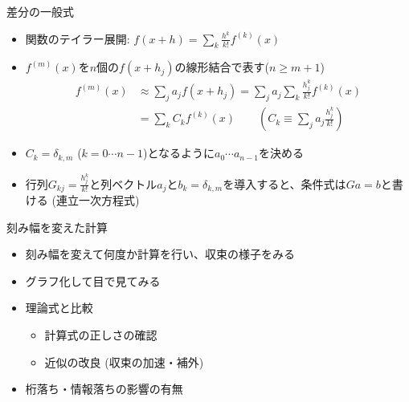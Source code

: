 \begin{frame}[t,fragile]{差分の一般式}
  \begin{itemize}
  \item 関数のテイラー展開: $\displaystyle f(x+h) = \sum_{k} \frac{h^k}{k!} f^{(k)}(x)$
  \item $f^{(m)}(x)$を$n$個の$f(x+h_j)$の線形結合で表す($n \ge m+1$)
    \begin{align*}
      f^{(m)}(x) &\approx \sum_j a_j f(x+h_j) = \sum_j a_j \sum_{k} \frac{h_j^k}{k!} f^{(k)}(x) \\
      & = \sum_{k} C_k f^{(k)}(x) \qquad (C_k \equiv \sum_j a_j \frac{h_j^k}{k!})
    \end{align*}
  \item $C_k = \delta_{k,m}$ ($k = 0 \cdots n-1$)となるように$a_0 \cdots a_{n-1}$を決める
  \item 行列$\displaystyle G_{kj} = \frac{h_j^k}{k!}$と列ベクトル$a_j$と$b_k = \delta_{k,m}$を導入すると、条件式は$G a = b$と書ける (連立一次方程式)
  \end{itemize}
\end{frame}

\begin{frame}[t,fragile]{刻み幅を変えた計算}
  \begin{itemize}
    \setlength{\itemsep}{1em}
  \item 刻み幅を変えて何度か計算を行い、収束の様子をみる
  \item グラフ化して目で見てみる
  \item 理論式と比較
    \begin{itemize}
    \item 計算式の正しさの確認
    \item 近似の改良 (収束の加速・補外)
    \end{itemize}
  \item 桁落ち・情報落ちの影響の有無
  \end{itemize}
\end{frame}

